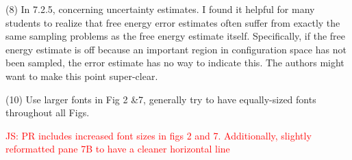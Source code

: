 \documentclass[10pt,stdletter]{newlfm}
\begin{document}
\begin{newlfm}
(8) In 7.2.5, concerning uncertainty estimates. I found it helpful for many students to realize that free energy error estimates often suffer from exactly the same sampling problems as the free energy estimate itself. Specifically, if the free energy estimate is off because an important region in configuration space has not been sampled, the error estimate has no way to indicate this. The authors might want to make this point super-clear.

(10) Use larger fonts in Fig 2 &7, generally try to have equally-sized fonts throughout all Figs.

\textcolor{red}{JS: PR includes increased font sizes in figs 2 and 7. Additionally, slightly reformatted pane 7B to have a cleaner horizontal line}


\end{newlfm}
\end{document}
